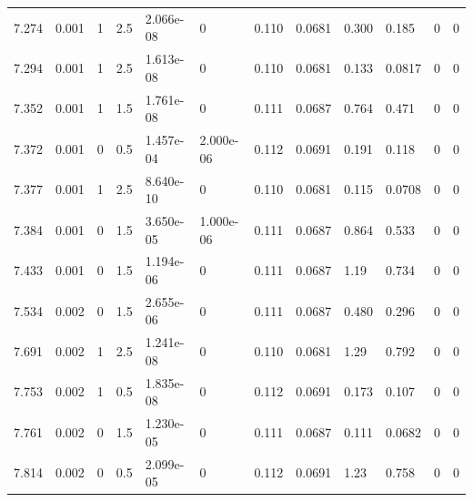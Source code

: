 \documentclass[preview]{standalone}
\begin{document}
{{{{\begin{tabular}{L{1.2cm}C{1.2cm} C{0.3cm}C{0.5cm} C{1.4cm}C{1.4cm} C{1.4cm}C{1.4cm} C{1.6cm}C{1.6cm} C{1.6cm}C{1.6cm}}
  7.274  &  0.001  & 1     & 2.5 &  2.066e-08  & 0  &  0.110&   0.0681& 0.300 & 0.185   &  0 & 0  \\ 
  7.294  &  0.001  & 1     & 2.5 &  1.613e-08  & 0  &  0.110&   0.0681& 0.133 & 0.0817   &  0 & 0  \\ 
  7.352  &  0.001  & 1     & 1.5 &  1.761e-08  & 0  &  0.111&   0.0687& 0.764 & 0.471   &  0 & 0  \\ 
  7.372  &  0.001  & 0     & 0.5 &  1.457e-04  & 2.000e-06  &  0.112&   0.0691& 0.191 & 0.118   &  0 & 0  \\ 
  7.377  &  0.001  & 1     & 2.5 &  8.640e-10  & 0  &  0.110&   0.0681& 0.115 & 0.0708   &  0 & 0  \\ 
  7.384  &  0.001  & 0     & 1.5 &  3.650e-05  & 1.000e-06  &  0.111&   0.0687& 0.864 & 0.533   &  0 & 0  \\ 
  7.433  &  0.001  & 0     & 1.5 &  1.194e-06  & 0  &  0.111&   0.0687& 1.19 & 0.734   &  0 & 0  \\ 
  7.534  &  0.002  & 0     & 1.5 &  2.655e-06  & 0  &  0.111&   0.0687& 0.480 & 0.296   &  0 & 0  \\ 
  7.691  &  0.002  & 1     & 2.5 &  1.241e-08  & 0  &  0.110&   0.0681& 1.29 & 0.792   &  0 & 0  \\ 
  7.753  &  0.002  & 1     & 0.5 &  1.835e-08  & 0  &  0.112&   0.0691& 0.173 & 0.107   &  0 & 0  \\ 
  7.761  &  0.002  & 0     & 1.5 &  1.230e-05  & 0  &  0.111&   0.0687& 0.111 & 0.0682   &  0 & 0  \\ 
  7.814  &  0.002  & 0     & 0.5 &  2.099e-05  & 0  &  0.112&   0.0691& 1.23 & 0.758   &  0 & 0  \\ 
\hline 
\end{tabular} 

}}}}
\end{document}
